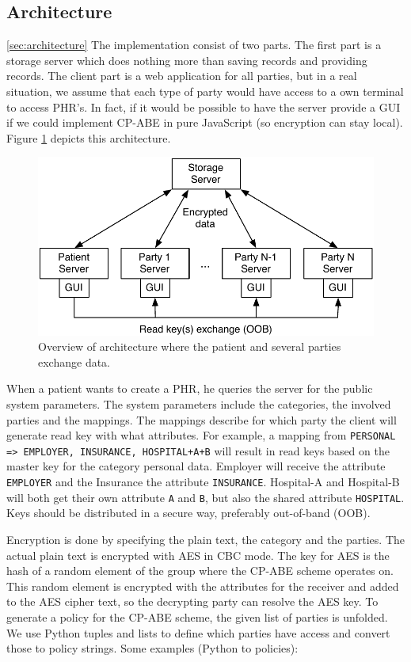 \documentclass[a4paper]{article}
\begin{document}
	\subsection{Architecture}\ref{sec:architecture}
		The implementation consist of two parts. The first part is a storage server which does nothing more than saving records and providing records. The client part is a web application for all parties, but in a real situation, we assume that each type of party would have access to a own terminal to access PHR's. In fact, if it would be possible to have the server provide a GUI if we could implement CP-ABE in pure JavaScript (so encryption can stay local). Figure \ref{fig:architecture} depicts this architecture.
		
		\begin{figure}[H]
	        \centering
            \includegraphics[width=0.75\columnwidth]{figures/architecture.pdf}
	     	\caption{Overview of architecture where the patient and several parties exchange data.}
			\label{fig:architecture}
		\end{figure}
	
		When a patient wants to create a PHR, he queries the server for the public system parameters. The system parameters include the categories, the involved parties and the mappings. The mappings describe for which party the client will generate read key with what attributes. For example, a mapping from \texttt{PERSONAL => EMPLOYER, INSURANCE, HOSPITAL+A+B} will result in read keys based on the master key for the category personal data. Employer will receive the attribute \texttt{EMPLOYER} and the Insurance the attribute \texttt{INSURANCE}. Hospital-A and Hospital-B will both get their own attribute \texttt{A} and \texttt{B}, but also the shared attribute \texttt{HOSPITAL}. Keys should be distributed in a secure way, preferably out-of-band (OOB).
		
		Encryption is done by specifying the plain text, the category and the parties. The actual plain text is encrypted with AES in CBC mode. The key for AES is the hash of a random element of the group where the CP-ABE scheme operates on. This random element is encrypted with the attributes for the receiver and added to the AES cipher text, so the decrypting party can resolve the AES key. To generate a policy for the CP-ABE scheme, the given list of parties is unfolded. We use Python tuples and lists to define which parties have access and convert those to policy strings. Some examples (Python to policies):
		
\end{document}
